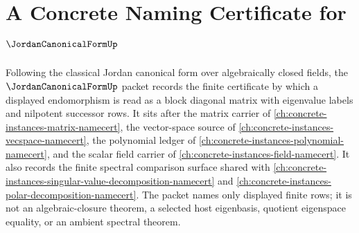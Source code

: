 \chapter{A Concrete Naming Certificate for $\JordanCanonicalFormUp$}
\label{ch:concrete-instances-jordan-canonical-form-namecert}

Following the classical Jordan canonical form over algebraically closed fields, the $\JordanCanonicalFormUp$ packet records the finite certificate by which a displayed endomorphism is read as a block diagonal matrix with eigenvalue labels and nilpotent successor rows. It sits after the matrix carrier of \autoref{ch:concrete-instances-matrix-namecert}, the vector-space source of \autoref{ch:concrete-instances-vecspace-namecert}, the polynomial ledger of \autoref{ch:concrete-instances-polynomial-namecert}, and the scalar field carrier of \autoref{ch:concrete-instances-field-namecert}. It also records the finite spectral comparison surface shared with \autoref{ch:concrete-instances-singular-value-decomposition-namecert} and \autoref{ch:concrete-instances-polar-decomposition-namecert}. The packet names only displayed finite rows; it is not an algebraic-closure theorem, a selected host eigenbasis, quotient eigenspace equality, or an ambient spectral theorem.

